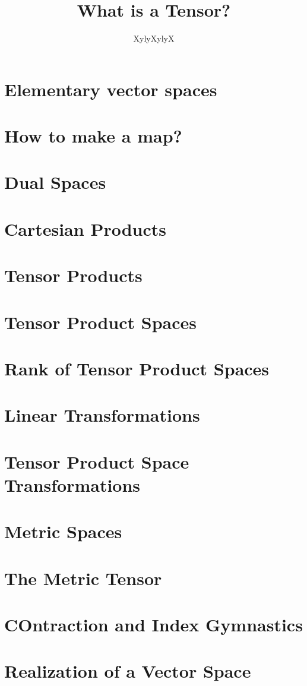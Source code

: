 \documentclass{article}
\title{What is a Tensor?}
\author{XylyXylyX}
\date{}
\begin{document}
\maketitle

\newpage
\tableofcontents
\newpage 

\section{Elementary vector spaces}
\section{How to make a map?}
\section{Dual Spaces}
\section{Cartesian Products}
\section{Tensor Products}
\section{Tensor Product Spaces}
\section{Rank of Tensor Product Spaces}
\section{Linear Transformations}
\section{Tensor Product Space Transformations}
\section{Metric Spaces}
\section{The Metric Tensor}
\section{COntraction and Index Gymnastics}
\section{Realization of a Vector Space}
\end{document}
